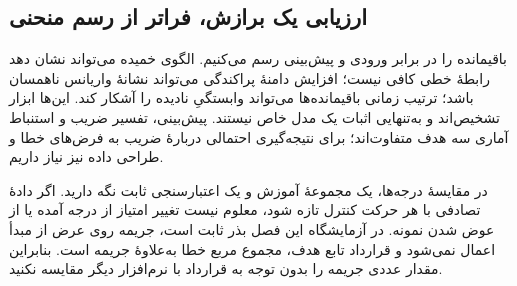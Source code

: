 \subsection*{ارزیابی یک برازش، فراتر از رسم منحنی}
باقیمانده را در برابر ورودی و پیش‌بینی رسم می‌کنیم. الگوی خمیده می‌تواند نشان دهد رابطهٔ خطی کافی نیست؛ افزایش دامنهٔ پراکندگی می‌تواند نشانهٔ واریانس ناهمسان باشد؛ ترتیب زمانی باقیمانده‌ها می‌تواند وابستگیِ نادیده را آشکار کند. این‌ها ابزار تشخیص‌اند و به‌تنهایی اثبات یک مدل خاص نیستند. پیش‌بینی، تفسیر ضریب و استنباط آماری سه هدف متفاوت‌اند؛ برای نتیجه‌گیری احتمالی دربارهٔ ضریب به فرض‌های خطا و طراحی داده نیز نیاز داریم.

در مقایسهٔ درجه‌ها، یک مجموعهٔ آموزش و یک اعتبارسنجی ثابت نگه دارید. اگر دادهٔ تصادفی با هر حرکت کنترل تازه شود، معلوم نیست تغییر امتیاز از درجه آمده یا از عوض شدن نمونه. در آزمایشگاه این فصل بذر ثابت است، جریمه روی عرض از مبدأ اعمال نمی‌شود و قرارداد تابع هدف، مجموع مربع خطا به‌علاوهٔ جریمه است. بنابراین مقدار عددی جریمه را بدون توجه به قرارداد با نرم‌افزار دیگر مقایسه نکنید.

